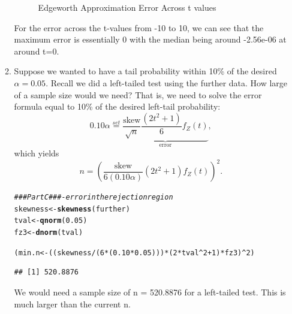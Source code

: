\documentclass{article}\usepackage[]{graphicx}\usepackage[]{xcolor}
\makeatletter
\newcommand{\hlnum}[1]{\textcolor[rgb]{0.686,0.059,0.569}{#1}}%
\newcommand{\hlcom}[1]{\textcolor[rgb]{0.678,0.584,0.686}{\textit{#1}}}%
\newcommand{\hlopt}[1]{\textcolor[rgb]{0,0,0}{#1}}%
\newcommand{\hldef}[1]{\textcolor[rgb]{0.345,0.345,0.345}{#1}}%
\newcommand{\hlkwb}[1]{\textcolor[rgb]{0.69,0.353,0.396}{#1}}%
\newcommand{\hlkwd}[1]{\textcolor[rgb]{0.737,0.353,0.396}{\textbf{#1}}}%
\newenvironment{kframe}{%
 \def\at@end@of@kframe{}%
 \ifinner\ifhmode%
  \def\at@end@of@kframe{\end{minipage}}%
  \begin{minipage}{\columnwidth}%
 \fi\fi%
 \def\FrameCommand##1{\hskip\@totalleftmargin \hskip-\fboxsep
 \colorbox{shadecolor}{##1}\hskip-\fboxsep
     \hskip-\linewidth \hskip-\@totalleftmargin \hskip\columnwidth}%
 \MakeFramed {\advance\hsize-\width
   \@totalleftmargin\z@ \linewidth\hsize
   \@setminipage}}%
 {\par\unskip\endMakeFramed%
 \at@end@of@kframe}
\newenvironment{knitrout}{}{} %
\makeatother
\begin{document}
\begin{enumerate}
\begin{enumerate}
\begin{figure}[H]
\begin{center}
\begin{knitrout}
{}


\end{knitrout}
\caption{Edgeworth Approximation Error Across t values}
\label{plot1} 
\end{center}
\end{figure}
For the error across the t-values from -10 to 10, we can see that the maximum error is essentially 0 with the median being around -2.56e-06 at around t=0. 
  \item Suppose we wanted to have a tail probability within 10\% of the desired
  $\alpha=0.05$. Recall we did a left-tailed test using the further data.
  How large of a sample size would we need? That is, we need
  to solve the error formula equal to 10\% of the desired left-tail probability:
  \[0.10 \alpha  \stackrel{set}{=} \underbrace{\frac{\text{skew}}{\sqrt{n}} \frac{(2t^2+1)}{6} f_Z(t)}_{\textrm{error}},\]
  which yields
  \[ n = \left(\frac{\text{skew}}{6(0.10\alpha)} (2t^2 + 1) f_Z(t)\right)^2.\]
\begin{knitrout}
\color{fgcolor}\begin{kframe}
\begin{alltt}
\hlcom{### Part C ### - error in the rejection region}
\hldef{skewness} \hlkwb{<-} \hlkwd{skewness}\hldef{(further)}
\hldef{tval} \hlkwb{<-} \hlkwd{qnorm}\hldef{(}\hlnum{0.05}\hldef{)}
\hldef{fz3} \hlkwb{<-} \hlkwd{dnorm}\hldef{(tval)}

\hldef{(min.n} \hlkwb{<-} \hldef{((skewness}\hlopt{/}\hldef{(}\hlnum{6}\hlopt{*}\hldef{(}\hlnum{0.10}\hlopt{*}\hlnum{0.05}\hldef{)))} \hlopt{*} \hldef{(}\hlnum{2}\hlopt{*}\hldef{tval}\hlopt{^}\hlnum{2} \hlopt{+} \hlnum{1}\hldef{)} \hlopt{*}\hldef{fz3)}\hlopt{^}\hlnum{2}\hldef{)}
\end{alltt}
\begin{verbatim}
## [1] 520.8876
\end{verbatim}
\end{kframe}
\end{knitrout}
We would need a sample size of n = 520.8876 for a left-tailed test. This is much larger than the current n.  
  

\end{enumerate}
\end{enumerate}
\end{document}
